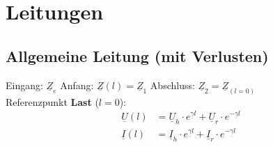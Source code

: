 \section{Leitungen}


\subsection{Allgemeine Leitung (mit Verlusten)}

Eingang: $ \underline{Z}_e $ \quad Anfang: $ \underline{Z}(l) = \underline{Z}_1 $ \quad
Abschluss: $ \underline{Z}_2 = \underline{Z}_{(l=0)}$ \\
Referenzpunkt \textbf{Last} ($ l=0 $):
\begin{align*}
	\underline{U}(l)   & = \underline{U}_h \cdot e^{\underline{\gamma}l} + \underline{U}_r \cdot e^{-\underline{\gamma} l}                    \\
	\underline{I}(l)   & = \underline{I}_h \cdot e^{\underline{\gamma} l} + \underline{I}_r \cdot e^{-\underline{\gamma} l}
\end{align*}


